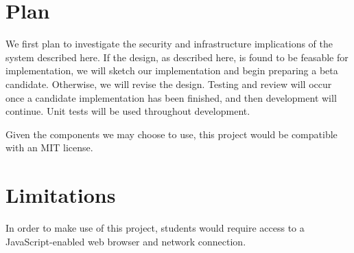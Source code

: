 \documentclass[12pt]{paper}
\begin{document}
	\section{Plan}
  We first plan to investigate the security and infrastructure implications of the system described here.
  If the design, as described here, is found to be feasable for implementation, we will sketch our implementation
  and begin preparing a beta candidate. Otherwise, we will revise the design. Testing and review will occur once
  a candidate implementation has been finished, and then development will continue. Unit tests will be used
  throughout development.

  Given the components we may choose to use, this project would be compatible with an MIT license.
	
	\section{Limitations}
  In order to make use of this project, students would require access to a JavaScript-enabled web browser and network connection.
\end{document}
